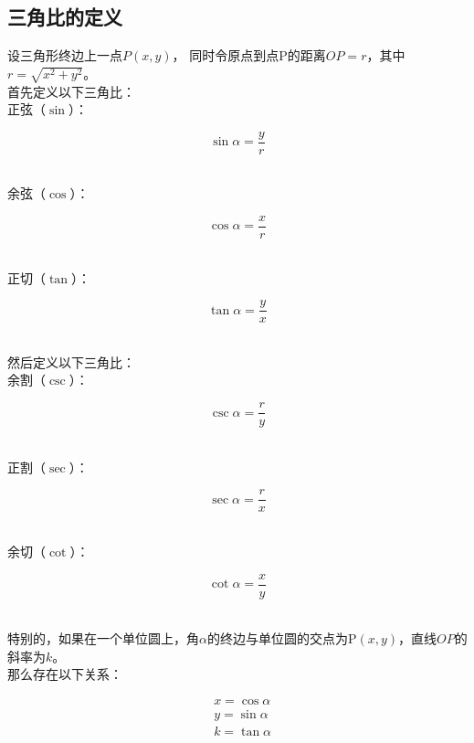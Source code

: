 \documentclass[UTF8]{ctexart}
\begin{document}
\subsection{三角比的定义}
    设三角形终边上一点$P(x,y)$，
    同时令原点到点P的距离$OP=r$，其中$r=\sqrt{x^2+y^2}$。\\[5mm]
    首先定义以下三角比：\\[3mm]
    正弦（$\sin$）：
    \begin{large}
    \begin{equation*}
        \sin{\alpha}=\dfrac{y}{r}
    \end{equation*}   
    \end{large}\\
    余弦（$\cos$）：
    \begin{large}
    \begin{equation*}
        \cos{\alpha}=\dfrac{x}{r}
    \end{equation*}   
    \end{large}\\
    正切（$\tan$）：
    \begin{large}
    \begin{equation*}
        \tan{\alpha}=\dfrac{y}{x}
    \end{equation*}   
    \end{large}\\
    然后定义以下三角比：\\[3mm]
    余割（$\csc$）：
    \begin{large}
    \begin{equation*}
        \csc{\alpha}=\dfrac{r}{y}
    \end{equation*}   
    \end{large}\\
    正割（$\sec$）：
    \begin{large}
    \begin{equation*}
        \sec{\alpha}=\dfrac{r}{x}
    \end{equation*}   
    \end{large}\\
    余切（$\cot$）：
    \begin{large}
    \begin{equation*}
        \cot{\alpha}=\dfrac{x}{y}
    \end{equation*}   
    \end{large}\\[3mm]
    特别的，如果在一个单位圆上，角$\alpha$的终边与单位圆的交点为P$(x,y)$，直线$OP$的斜率为$k$。\\[3mm]
    那么存在以下关系：
    \begin{large}
        \begin{align*}
            &x=\cos{\alpha}\\[3mm]
            &y=\sin{\alpha}\\[3mm]
            &k=\tan{\alpha}
        \end{align*}
    \end{large}
\end{document}
